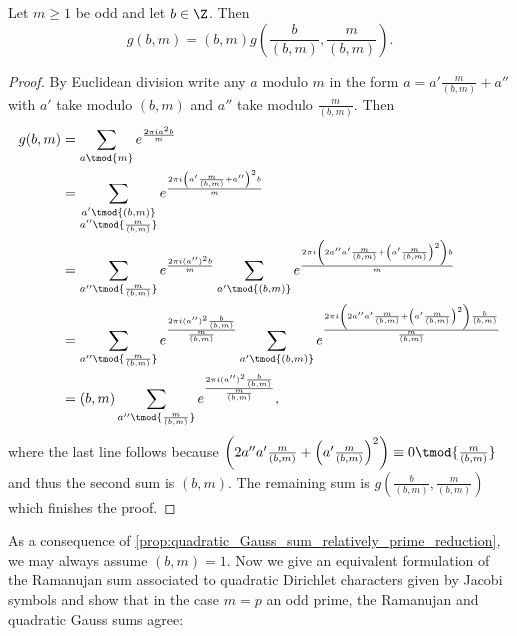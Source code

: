         \begin{proposition}\label{prop:quadratic_Gauss_sum_relatively_prime_reduction}
          Let $m \ge 1$ be odd and let $b \in \Z$. Then
          \[
            g(b,m) = (b,m)g\left(\frac{b}{(b,m)},\frac{m}{(b,m)}\right).
          \]
        \end{proposition}
        \begin{proof}
          By Euclidean division write any $a$ modulo $m$ in the form $a = a'\frac{m}{(b,m)}+a''$ with $a'$ take modulo $(b,m)$ and $a''$ take modulo $\frac{m}{(b,m)}$. Then
          \begin{align*}
            g(b,m) &= \sum_{a \tmod{m}}e^{\frac{2\pi ia^{2}b}{m}} \\
            &= \sum_{\substack{a' \tmod{(b,m)} \\ a'' \tmod{\frac{m}{(b,m)}}}}e^{\frac{2\pi i\left(a'\frac{m}{(b,m)}+a''\right)^{2}b}{m}} \\
            &= \sum_{a'' \tmod{\frac{m}{(b,m)}}}e^{\frac{2\pi i(a'')^{2}b}{m}}\sum_{a' \tmod{(b,m)}}e^{\frac{2\pi i\left(2a''a'\frac{m}{(b,m)}+\left(a'\frac{m}{(b,m)}\right)^{2}\right)b}{m}} \\
            &= \sum_{a'' \tmod{\frac{m}{(b,m)}}}e^{\frac{2\pi i(a'')^{2}\frac{b}{(b,m)}}{\frac{m}{(b,m)}}}\sum_{a' \tmod{(b,m)}}e^{\frac{2\pi i\left(2a''a'\frac{m}{(b,m)}+\left(a'\frac{m}{(b,m)}\right)^{2}\right)\frac{b}{(b,m)}}{\frac{m}{(b,m)}}} \\
            &= (b,m)\sum_{a'' \tmod{\frac{m}{(b,m)}}}e^{\frac{2\pi i(a'')^{2}\frac{b}{(b,m)}}{\frac{m}{(b,m)}}},
          \end{align*}
          where the last line follows because $\left(2a''a'\frac{m}{(b,m)}+\left(a'\frac{m}{(b,m)}\right)^{2}\right) \equiv 0 \tmod{\frac{m}{(b,m)}}$ and thus the second sum is $(b,m)$. The remaining sum is $g\left(\frac{b}{(b,m)},\frac{m}{(b,m)}\right)$ which finishes the proof.
        \end{proof}

        As a consequence of \cref{prop:quadratic_Gauss_sum_relatively_prime_reduction}, we may always assume $(b,m) = 1$. Now we give an equivalent formulation of the Ramanujan sum associated to quadratic Dirichlet characters given by Jacobi symbols and show that in the case $m = p$ an odd prime, the Ramanujan and quadratic Gauss sums agree:

